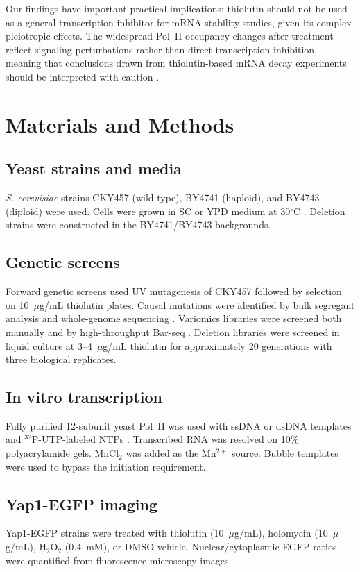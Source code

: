 \documentclass[11pt,a4paper]{article}
\begin{document}
Our findings have important practical implications: thiolutin should not be used as a general transcription inhibitor for mRNA stability studies, given its complex pleiotropic effects. The widespread Pol~II occupancy changes after treatment reflect signaling perturbations rather than direct transcription inhibition, meaning that conclusions drawn from thiolutin-based mRNA decay experiments should be interpreted with caution \citep{Grigull2004, Pelechano2010}.

\section{Materials and Methods}

\subsection{Yeast strains and media}
\textit{S. cerevisiae} strains CKY457 (wild-type), BY4741 (haploid), and BY4743 (diploid) were used. Cells were grown in SC or YPD medium at 30$^\circ$C \citep{Sherman2002}. Deletion strains were constructed in the BY4741/BY4743 backgrounds.

\subsection{Genetic screens}
Forward genetic screens used UV mutagenesis of CKY457 followed by selection on 10~$\mu$g/mL thiolutin plates. Causal mutations were identified by bulk segregant analysis and whole-genome sequencing \citep{Ehrenreich2010}. Variomics libraries were screened both manually and by high-throughput Bar-seq \citep{Segal2018}. Deletion libraries were screened in liquid culture at 3--4~$\mu$g/mL thiolutin for approximately 20 generations with three biological replicates.

\subsection{In vitro transcription}
Fully purified 12-subunit yeast Pol~II was used with ssDNA or dsDNA templates and $^{32}$P-UTP-labeled NTPs \citep{Cramer2001}. Transcribed RNA was resolved on 10\% polyacrylamide gels. MnCl$_2$ was added as the Mn$^{2+}$ source. Bubble templates were used to bypass the initiation requirement.

\subsection{Yap1-EGFP imaging}
Yap1-EGFP strains were treated with thiolutin (10~$\mu$g/mL), holomycin (10~$\mu$g/mL), H$_2$O$_2$ (0.4~mM), or DMSO vehicle. Nuclear/cytoplasmic EGFP ratios were quantified from fluorescence microscopy images.
\end{document}
